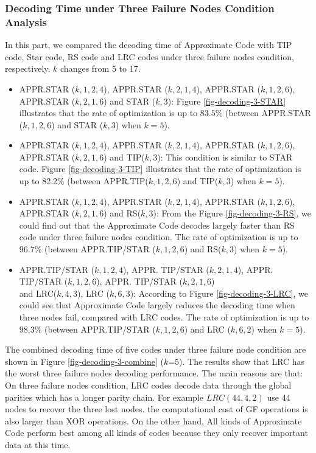 \documentclass[sigconf]{acmart}
\begin{document}
\subsubsection{Decoding Time under Three Failure Nodes Condition Analysis}
In this part, we compared the decoding time of Approximate Code with TIP code, Star code, RS code and LRC codes under three failure nodes condition, respectively. $k$ changes from 5 to 17.
\begin{itemize}
    \item APPR.STAR ($k,1,2,4$), APPR.STAR ($k,2,1,4$), APPR.STAR ($k,1,2,6$), APPR.STAR ($k,2,1,6$) and STAR ($k,3$): Figure \ref{fig-decoding-3-STAR} illustrates that the rate of optimization is up to $83.5\%$ (between APPR.STAR ($k,1,2,6$) and STAR ($k,3$) when $k = 5$).
    \item APPR.STAR ($k,1,2,4$), APPR.STAR ($k,2,1,4$), APPR.STAR ($k,1,2,6$), APPR.STAR ($k,2,1,6$) and TIP($k,3$): This condition is similar to STAR code. Figure \ref{fig-decoding-3-TIP} illustrates that the rate of optimization is up to 82.2\% (between APPR.TIP($k,1,2,6$) and TIP($k,3$) when $k = 5$).
    \item APPR.STAR ($k,1,2,4$), APPR.STAR ($k,2,1,4$), APPR.STAR ($k,1,2,6$), APPR.STAR ($k,2,1,6$) and RS($k,3$): From the Figure \ref{fig-decoding-3-RS}, we could find out that the Approximate Code decodes largely faster than RS code under three failure nodes condition. The rate of optimization is up to $96.7\%$ (between APPR.TIP/STAR ($k,1,2,6$) and RS($k,3$) when $k = 5$).
    \item APPR.TIP/STAR ($k,1,2,4$), APPR. TIP/STAR ($k,2,1,4$), APPR. TIP/STAR ($k,1,2,6$), APPR. TIP/STAR ($k,2,1,6$)  \\
    and LRC($k,4,3$), LRC ($k,6,3$):
    According to Figure \ref{fig-decoding-3-LRC}, we could see that Approximate Code largely reduces the decoding time when three nodes fail, compared with LRC codes. The rate of optimization is up to $98.3\%$  (between APPR.TIP/STAR ($k,1,2,6$) and LRC ($k, 6, 2$) when $k = 5$).
\end{itemize}

The combined decoding time of five codes under three failure node condition are shown in Figure \ref{fig-decoding-3-combine} ($k$=5). The results show that LRC has the worst three failure nodes decoding performance. The main reasons are that: On three failure nodes condition, LRC codes decode data through the global parities which has a longer parity chain. For example $LRC (44,4,2)$ use 44 nodes to recover the three lost nodes. the computational cost of GF operations is also larger than XOR operations. On the other hand, All kinds of Approximate Code perform best among all kinds of codes because they only recover important data at this time.
\end{document}
